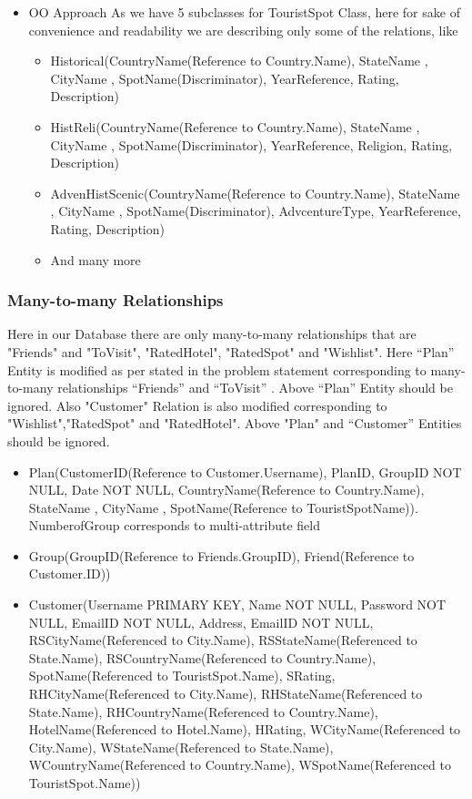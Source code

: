 \documentclass[a4paper,11pt]{article}
\begin{document}
\begin{itemize}
\begin{itemize}
\begin{itemize}
\end{itemize}
\item OO Approach \newline
As we have 5 subclasses for TouristSpot Class, here for sake of convenience and readability we are describing only some of the relations, like
\begin{itemize}
\item Historical(CountryName(Reference to Country.Name), StateName , CityName , SpotName(Discriminator), YearReference, Rating, Description)
\item HistReli(CountryName(Reference to Country.Name), StateName , CityName , SpotName(Discriminator), YearReference, Religion, Rating, Description)
\item AdvenHistScenic(CountryName(Reference to Country.Name), StateName , CityName , SpotName(Discriminator), AdvcentureType, YearReference, Rating, Description)
\item And many more
\end{itemize}
\end{itemize}
\end{itemize}

\subsubsection{Many-to-many Relationships}
Here in our Database there are only many-to-many relationships that are "Friends" and "ToVisit", "RatedHotel", "RatedSpot" and "Wishlist". Here “Plan” Entity is modified as per stated in the problem statement corresponding to many-to-many relationships “Friends” and “ToVisit” . Above “Plan” Entity should be ignored. Also "Customer" Relation is also modified corresponding to "Wishlist","RatedSpot" and "RatedHotel". Above "Plan" and “Customer” Entities should be ignored.
\begin{itemize}
\item Plan(CustomerID(Reference to Customer.Username), PlanID, GroupID NOT NULL, Date NOT NULL, CountryName(Reference to Country.Name), StateName , CityName , SpotName(Reference to TouristSpotName)). NumberofGroup corresponds to multi-attribute field

\item Group(GroupID(Reference to Friends.GroupID), Friend(Reference to Customer.ID))

\item Customer(Username PRIMARY KEY, Name NOT NULL, Password NOT NULL, EmailID NOT NULL, Address, EmailID NOT NULL, RSCityName(Referenced to City.Name), RSStateName(Referenced to State.Name), RSCountryName(Referenced to Country.Name), SpotName(Referenced to TouristSpot.Name), SRating, RHCityName(Referenced to City.Name), RHStateName(Referenced to State.Name), RHCountryName(Referenced to Country.Name), HotelName(Referenced to Hotel.Name), HRating, WCityName(Referenced to City.Name), WStateName(Referenced to State.Name), WCountryName(Referenced to Country.Name), WSpotName(Referenced to TouristSpot.Name))
\end{itemize}
\end{document}
